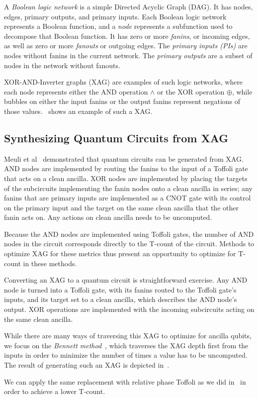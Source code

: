 A {\it Boolean logic network} is a simple Directed Acyclic Graph (DAG). It has nodes,
edges, primary outputs, and primary inputs. Each Boolean logic network represents a
Boolean function, and a \emph{node} represents a subfunction used to decompose that Boolean
function. It has zero or more {\it fanins}, or incoming edges, as well as zero or more
{\it fanouts} or outgoing edges. The {\it primary inputs (PIs)} are nodes without fanins
in the current network. The {\it primary outputs} are a subset of nodes in the network
without fanouts.

XOR-AND-Inverter graphs (XAG) are examples of such logic networks, where each node
represents either the AND operation $\land$ or the XOR operation $\oplus$, while
bubbles on either the input fanins or the output fanins represent negations of those
values.~ shows an example of such a XAG.

\subsection{Synthesizing Quantum Circuits from XAG}
\label{sub-synth-xag}
Meuli et al~\cite{bib-meuli-ros} demonstrated that quantum circuits can be generated from
XAG. AND nodes are implemented by routing the fanins to the input of a Toffoli gate that
acts on a clean ancilla. XOR nodes are implemented by placing the targets of the
subcircuits implementing the fanin nodes onto a clean ancilla in series; any fanins that
are primary inputs are implemented as a CNOT gate with its control on the primary input
and the target on the same clean ancilla that the other fanin acts on. Any actions on
clean ancilla needs to be uncomputed.

Because the AND nodes are implemented using Toffoli gates, the number of AND nodes in
the circuit corresponds directly to the T-count of the circuit. Methods to
optimize XAG for these metrics thus present an opportunity to optimize for T-count in
these methods.

Converting an XAG to a quantum circuit is straightforward exercise. Any AND node is 
turned into a Toffoli gate, with its fanins routed to the Toffoli gate's inputs, and
its target set to a clean ancilla, which describes the AND node's output. XOR operations
are implemented with the incoming subcircuits acting on the same clean ancilla.

While there are many ways of traversing this XAG to optimize for ancilla qubits, we
focus on the \emph{Bennett method}~\cite{bib-time-space-bennett}, which traverses the
XAG depth first from the inputs in order to minimize the number of times a value has to
be uncomputed. The result of generating such an XAG is depicted in~.

We can apply the same replacement with relative phase Toffoli as we did in~
in order to achieve a lower T-count. 


